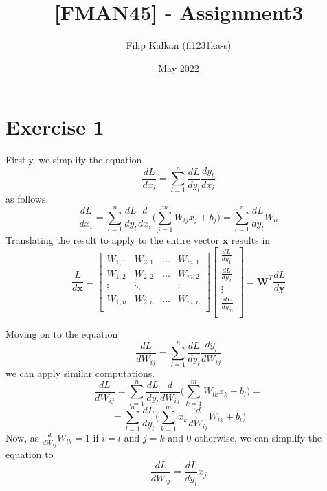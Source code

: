 \documentclass{article}
\title{[FMAN45] - Assignment3}
\author{Filip Kalkan (fi1231ka-s) }
\date{May 2022}
\begin{document}
\maketitle

\section{Exercise 1}
Firstly, we simplify the equation
\begin{equation}
     \frac{d L}{d x_i} = \sum_{l = 1}^n \frac{d L}{d y_l} \frac{d y_l}{d x_i}
\end{equation}
as follows.
\begin{equation}
    \frac{d L}{d x_i} = \sum_{l = 1}^n \frac{d L}{d y_l} \frac{d}{d x_i} \bigg( \sum_{j = 1}^m W_{l j} x_j + b_j \bigg) = \sum_{l = 1}^n \frac{d L}{d y_l} W_{l i}
\end{equation}
Translating the result to apply to the entire vector $\mathbf{x}$ results in
\begin{equation}
    \frac{L}{d \mathbf{x}} =
    \begin{bmatrix}
    W_{1, 1} & W_{2, 1} & \hdots & W_{m, 1} \\
    W_{1, 2} & W_{2, 2} & \hdots & W_{m, 2} \\
    \vdots & \ddots & & \vdots\\
    W_{1, n} & W_{2, n} & \hdots & W_{m, n} \\
    \end{bmatrix}
    \begin{bmatrix}
    \frac{d L}{d y_1} \\
    \frac{d L}{d y_2} \\
    \vdots \\
    \frac{d L}{d y_m} \\
    \end{bmatrix}
    = \mathbf{W}^T \frac{d L}{d \mathbf{y}}
\end{equation}

Moving on to the equation
\begin{equation}
    \frac{d L}{d W_{ij}} = \sum_{l = 1}^n \frac{d L}{d y_l} \frac{d y_l}{d W_{ij}}
\end{equation}
we can apply similar computations.
\begin{equation}
    \frac{d L}{d W_{ij}} = \sum_{l = 1}^n \frac{d L}{d y_l} \frac{d}{d W_{ij}}\bigg( \sum_{k = 1}^m W_{l k} x_k + b_l\bigg) =
\end{equation}
\begin{equation}
    = \sum_{l = 1}^n \frac{d L}{d y_l} \bigg( \sum_{k = 1}^m x_k \frac{d}{d W_{ij}} W_{l k} + b_l\bigg)
\end{equation}
Now, as $\frac{d}{d W_{ij}} W_{lk} = 1$ if $i = l$ and $j = k$ and $0$ otherwise, we can simplify the equation to
\begin{equation}
    \frac{d L}{d W_{ij}} = \frac{d L}{d y_i} x_j
\end{equation}
\end{document}

